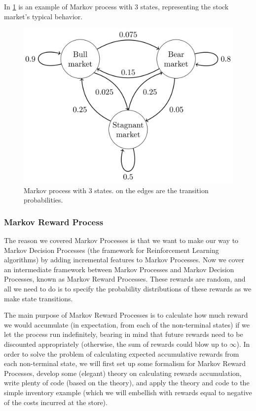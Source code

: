 \documentclass[../xlapes02]{subfiles}
\begin{document}
    In \cref{fig:markov-process} is an example of Markov process with 3 states, representing the stock market's typical behavior.

    \begin{figure}[h!]
        \includegraphics[width=0.5\linewidth]{image/mp}
        \centering
        \caption{Markov process with 3 states. on the edges are the transition probabilities.}
        \label{fig:markov-process}
    \end{figure}

    \subsubsection{Markov Reward Process}\label{subsubsec:markov-reward-process}
    The reason we covered Markov Processes is that we want to make our way to Markov Decision Processes (the framework for Reinforcement Learning algorithms) by adding incremental features to Markov Processes. Now we cover an intermediate framework between Markov Processes and Markov Decision Processes, known as Markov Reward Processes. These rewards are random, and all we need to do is to specify the probability distributions of these rewards as we make state transitions.

    The main purpose of Markov Reward Processes is to calculate how much reward we would accumulate (in expectation, from each of the non-terminal states) if we let the process run indefinitely, bearing in mind that future rewards need to be discounted appropriately (otherwise, the sum of rewards could blow up to $\infty$). In order to solve the problem of calculating expected accumulative rewards from each non-terminal state, we will first set up some formalism for Markov Reward Processes, develop some (elegant) theory on calculating rewards accumulation, write plenty of code (based on the theory), and apply the theory and code to the simple inventory example (which we will embellish with rewards equal to negative of the costs incurred at the store).
\end{document}
